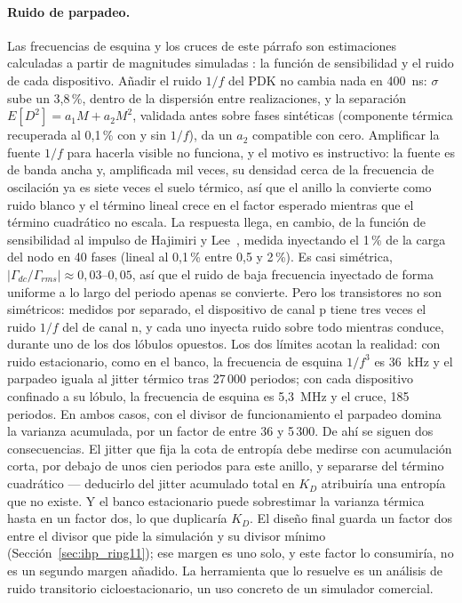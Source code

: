 \paragraph{Ruido de parpadeo.} Las frecuencias de esquina y los cruces
de este párrafo son estimaciones \est{} calculadas a partir de magnitudes
simuladas \simu{}: la función de sensibilidad y el ruido de cada
dispositivo. Añadir el ruido $1/f$ del \ac{PDK} no
cambia nada en 400~ns: $\sigma$ sube un 3,8\,\%, dentro de la dispersión
entre realizaciones, y la separación $E[D^2] = a_1 M + a_2 M^2$, validada
antes sobre fases sintéticas (componente térmica recuperada al 0,1\,\%
con y sin $1/f$), da un $a_2$ compatible con cero. Amplificar la fuente
$1/f$ para hacerla visible no funciona, y el motivo es instructivo: la
fuente es de banda ancha y, amplificada mil veces, su densidad cerca de la
frecuencia de oscilación ya es siete veces el suelo térmico, así que el
anillo la convierte como ruido blanco y el término lineal crece en el
factor esperado mientras que el término cuadrático no escala. La
respuesta llega, en cambio, de la función de sensibilidad al impulso de
Hajimiri y Lee~\cite{hajimiri_1998_general}, medida inyectando el
1\,\% de la carga del nodo en 40 fases (lineal al 0,1\,\% entre 0,5 y
2\,\%). Es casi simétrica, $|\Gamma_{dc}/\Gamma_{rms}| \approx 0{,}03$--$0{,}05$,
así que el ruido de baja frecuencia inyectado de forma uniforme a lo largo
del periodo apenas se convierte. Pero los transistores no son simétricos:
medidos por separado, el dispositivo de canal p tiene tres veces el ruido
$1/f$ del de canal n, y cada uno inyecta ruido sobre todo mientras
conduce, durante uno de los dos lóbulos opuestos. Los dos límites acotan
la realidad: con ruido estacionario, como en el banco, la frecuencia de
esquina $1/f^3$ es 36~kHz y el parpadeo iguala al jitter térmico tras
27\,000 periodos; con cada dispositivo confinado a su lóbulo, la
frecuencia de esquina es 5,3~MHz y el cruce, 185 periodos. En ambos
casos, con el divisor de funcionamiento el parpadeo domina la varianza
acumulada, por un factor de entre 36 y 5\,300. De ahí se siguen dos
consecuencias. El jitter que fija la cota de entropía debe medirse con
acumulación corta, por debajo de unos cien periodos para este anillo, y
separarse del término cuadrático --- deducirlo del jitter acumulado total
en $K_D$ atribuiría una entropía que no existe. Y el banco estacionario
puede sobrestimar la varianza térmica hasta en un factor dos, lo que
duplicaría $K_D$. El diseño final guarda un factor dos entre el divisor
que pide la simulación y su divisor mínimo
(Sección~\ref{sec:ihp_ring11}); ese margen es uno solo, y este factor lo
consumiría, no es un segundo margen añadido. La herramienta que lo
resuelve es un análisis de ruido transitorio cicloestacionario, un uso
concreto de un simulador comercial.

